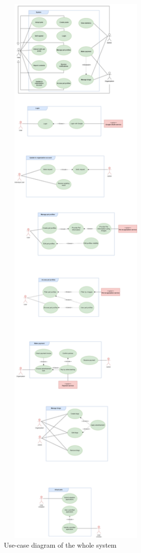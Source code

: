 \begin{figure}[H]
  \centering
  \includegraphics[width=0.7\textwidth]{Figures/whole-system.png}
  \caption{Use-case diagram of the whole system}
  \label{fig:whole-system_activity_diagram}
\end{figure}

